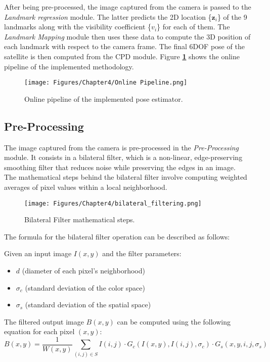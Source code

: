 After being pre-processed, the image captured from the camera is passed to the \textit{Landmark regression} module. The latter predicts the 2D location \{\(\textbf{z}_i\)\} of the 9 landmarks along with the visibility coefficient \{\(v_i\)\} for each of them. The \textit{Landmark Mapping} module then uses these data to compute the 3D position of each landmark with respect to the camera frame. The final 6DOF pose of the satellite is then computed from the CPD module. Figure \textbf{\ref{fig:Online Pipeline}} shows the online pipeline of the implemented methodology.
\begin{figure}[H]
    \centering
    \texttt{[image: Figures/Chapter4/Online Pipeline.png]}
    \caption[Online pipeline of the implemented pose estimator.]{Online pipeline of the implemented pose estimator.}
    \label{fig:Online Pipeline}
\end{figure}


\subsection{Pre-Processing}
\label{Chapter4/Pre-Processing}
The image captured from the camera is pre-processed in the \textit{Pre-Processing} module. It consists in a bilateral filter, which is a non-linear, edge-preserving smoothing filter that reduces noise while preserving the edges in an image.\\
The mathematical steps behind the bilateral filter involve computing weighted averages of pixel values within a local neighborhood. 
\begin{figure}[th]
    \centering
    \texttt{[image: Figures/Chapter4/bilateral\_filtering.png]}
    \caption[Bilateral Filter.]{Bilateral Filter mathematical steps.}
    \label{fig:Bilateral Filter}
\end{figure}

The formula for the bilateral filter operation can be described as follows:

Given an input image \(I(x, y)\) and the filter parameters:
\begin{itemize}
    \item \(d\) (diameter of each pixel's neighborhood)
    \item \(\sigma_c\) (standard deviation of the color space)
    \item \(\sigma_s\) (standard deviation of the spatial space)
\end{itemize}
The filtered output image \(B(x, y)\) can be computed using the following equation for each pixel \((x, y)\):
\begin{equation}
   B(x, y) = \frac{1}{W(x, y)} \sum_{(i, j) \in S} I(i, j) \cdot G_c(I(x, y), I(i, j), \sigma_c) \cdot G_s(x, y, i, j, \sigma_s) 
\end{equation}


